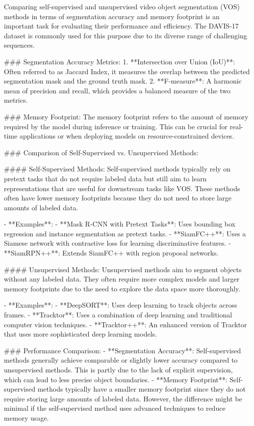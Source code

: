 Comparing self-supervised and unsupervised video object segmentation (VOS) methods in terms of segmentation accuracy and memory footprint is an important task for evaluating their performance and efficiency. The DAVIS-17 dataset is commonly used for this purpose due to its diverse range of challenging sequences.

### Segmentation Accuracy Metrics:
1. **Intersection over Union (IoU)**: Often referred to as Jaccard Index, it measures the overlap between the predicted segmentation mask and the ground truth mask.
2. **F-measure**: A harmonic mean of precision and recall, which provides a balanced measure of the two metrics.

### Memory Footprint:
The memory footprint refers to the amount of memory required by the model during inference or training. This can be crucial for real-time applications or when deploying models on resource-constrained devices.

### Comparison of Self-Supervised vs. Unsupervised Methods:

#### Self-Supervised Methods:
Self-supervised methods typically rely on pretext tasks that do not require labeled data but still aim to learn representations that are useful for downstream tasks like VOS. These methods often have lower memory footprints because they do not need to store large amounts of labeled data.

- **Examples**:
  - **Mask R-CNN with Pretext Tasks**: Uses bounding box regression and instance segmentation as pretext tasks.
  - **SiamFC++**: Uses a Siamese network with contrastive loss for learning discriminative features.
  - **SiamRPN++**: Extends SiamFC++ with region proposal networks.

#### Unsupervised Methods:
Unsupervised methods aim to segment objects without any labeled data. They often require more complex models and larger memory footprints due to the need to explore the data space more thoroughly.

- **Examples**:
  - **DeepSORT**: Uses deep learning to track objects across frames.
  - **Tracktor**: Uses a combination of deep learning and traditional computer vision techniques.
  - **Tracktor++**: An enhanced version of Tracktor that uses more sophisticated deep learning models.

### Performance Comparison:
- **Segmentation Accuracy**: Self-supervised methods generally achieve comparable or slightly lower accuracy compared to unsupervised methods. This is partly due to the lack of explicit supervision, which can lead to less precise object boundaries.
- **Memory Footprint**: Self-supervised methods typically have a smaller memory footprint since they do not require storing large amounts of labeled data. However, the difference might be minimal if the self-supervised method uses advanced techniques to reduce memory usage.

